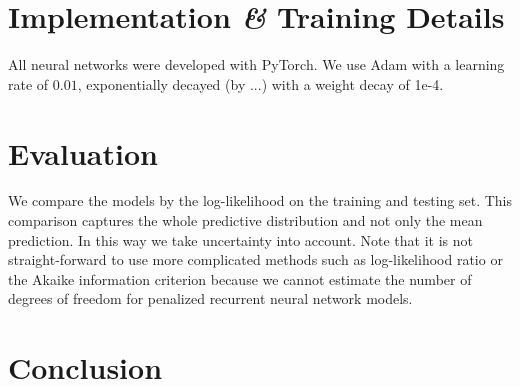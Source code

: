 \documentclass[nobib]{tufte-handout}
\begin{document}
\section{Implementation \textit{\&} Training Details}
All neural networks were developed with PyTorch.
We use Adam with a learning rate of $0.01$, exponentially decayed (by ...) with a weight decay of 1e-4.


\section{Evaluation}
We compare the models by the log-likelihood on the training and testing set.
This comparison captures the whole predictive distribution and not only the mean prediction.
In this way we take uncertainty into account.
Note that it is not straight-forward to use more complicated methods such as log-likelihood ratio or the Akaike information criterion because we cannot estimate the number of degrees of freedom for penalized recurrent neural network models.

\section{Conclusion}

\printbibliography
\end{document}
